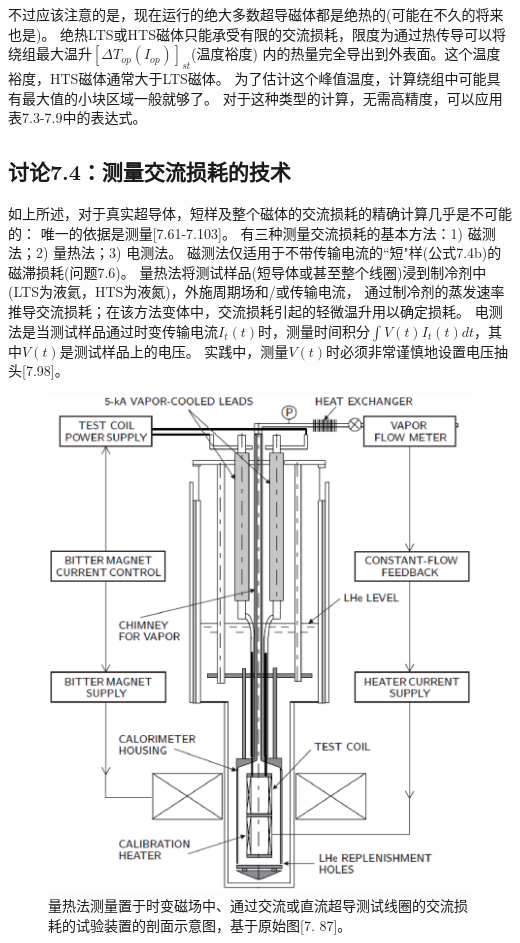 不过应该注意的是，现在运行的绝大多数超导磁体都是绝热的(可能在不久的将来也是)。
绝热LTS或HTS磁体只能承受有限的交流损耗，限度为通过热传导可以将绕组最大温升$[\Delta T_{op}(I_{op})]_{st}$(温度裕度)
内的热量完全导出到外表面。这个温度裕度，HTS磁体通常大于LTS磁体。
为了估计这个峰值温度，计算绕组中可能具有最大值的小块区域一般就够了。
对于这种类型的计算，无需高精度，可以应用表7.3-7.9中的表达式。


\subsection{讨论7.4：测量交流损耗的技术}
如上所述，对于真实超导体，短样及整个磁体的交流损耗的精确计算几乎是不可能的：
唯一的依据是测量[7.61-7.103]。
有三种测量交流损耗的基本方法：1) 磁测法；2) 量热法；3) 电测法。
磁测法仅适用于不带传输电流的``短"样(公式7.4b)的磁滞损耗(问题7.6)。
量热法将测试样品(短导体或甚至整个线圈)浸到制冷剂中(LTS为液氦，HTS为液氮)，外施周期场和/或传输电流，
通过制冷剂的蒸发速率推导交流损耗；在该方法变体中，交流损耗引起的轻微温升用以确定损耗。
电测法是当测试样品通过时变传输电流$I_t(t)$时，测量时间积分$\int V(t)I_t(t)dt$，其中$V(t)$是测试样品上的电压。
实践中，测量$V(t)$时必须非常谨慎地设置电压抽头[7.98]。

\begin{figure}[htbp]
	\centering
	\includegraphics[scale=0.7]{chpt7/figs/fig7.19.eps}
	\caption{量热法测量置于时变磁场中、通过交流或直流超导测试线圈的交流损耗的试验装置的剖面示意图，基于原始图[7.
		87]。}
\end{figure}

